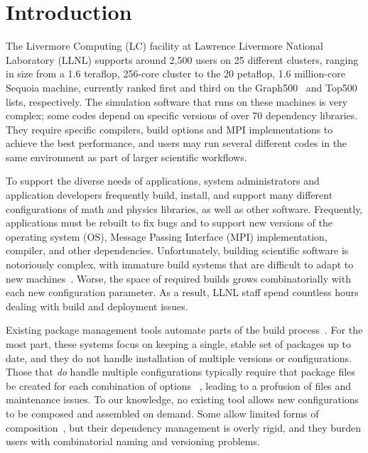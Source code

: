 
\section{Introduction}
\label{sec:intro}

The Livermore Computing (LC) facility at Lawrence Livermore National Laboratory
(LLNL) supports around 2,500 users on 25 different clusters, ranging
in size from a 1.6 teraflop, 256-core cluster to the
20 petaflop, 1.6 million-core Sequoia machine, currently ranked first and
third on the Graph500~\cite{graph500} and Top500~\cite{top500}
lists, respectively.
%
%
The simulation software that runs on these machines is very complex; some
codes depend on specific versions of over 70 dependency libraries.
They require specific compilers, build options and MPI implementations to
achieve the best performance, and users may run several
different codes in the same environment as part of larger
scientific workflows.

To support the diverse needs of applications, system administrators
and application developers frequently build, install, and support many
different configurations of math and physics libraries, as well as
other software.  Frequently, applications must be rebuilt to fix bugs
and to support new versions of the operating system (OS), Message
Passing Interface (MPI) implementation, compiler, and other
dependencies.  Unfortunately, building scientific software is
notoriously complex, with immature build systems that are difficult to
adapt to new
machines~\cite{dubois+:comp-sci-eng,hoste+:pyhpc12,wilson+:corr}.
Worse, the space of required builds grows combinatorially with each
new configuration parameter. As a result, LLNL staff spend countless
hours dealing with build and deployment issues.

Existing package management tools automate parts of the build
process~\cite{bsdports,digirolamo:smithy,dolstra+:icfp08,dolstra+:lisa04,hashdist,homebrew,hoste+:pyhpc12,macports,thiruvathukal:gentoo04}.
For the most part, these systems focus on keeping a single, stable set of
packages up to date, and they do not handle installation of multiple
versions or configurations.  Those that {\it do} handle multiple configurations
typically require that package files be created for each combination of
options~ \cite{digirolamo:smithy,dolstra+:icfp08,dolstra+:lisa04,hoste+:pyhpc12},
leading to a profusion of files and maintenance issues.
To our knowledge, no existing tool allows new configurations to be composed
and assembled on demand.  Some allow limited forms of
composition~\cite{hoste+:pyhpc12,dolstra+:icfp08,dolstra+:lisa04}, but their
dependency management is overly rigid, and they burden users with
combinatorial naming and versioning problems.

